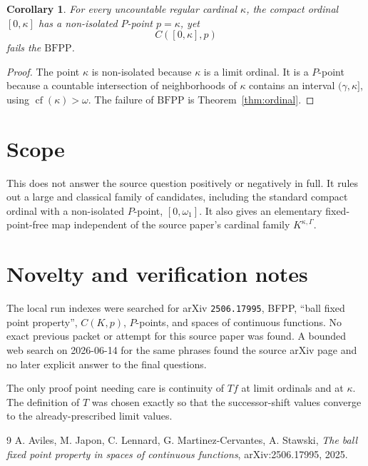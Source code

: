 \documentclass[11pt]{article}
\newtheorem{corollary}{Corollary}
\newcommand{\BFPP}{\mathrm{BFPP}}
\begin{document}
\begin{corollary}\label{cor:Ppoint}
For every uncountable regular cardinal \(\kappa\), the compact ordinal
\([0,\kappa]\) has a non-isolated \(P\)-point \(p=\kappa\), yet
\[
  C([0,\kappa],p)
\]
fails the \(\BFPP\).
\end{corollary}

\begin{proof}
The point \(\kappa\) is non-isolated because \(\kappa\) is a limit ordinal.  It
is a \(P\)-point because a countable intersection of neighborhoods of
\(\kappa\) contains an interval \((\gamma,\kappa]\), using
\(\operatorname{cf}(\kappa)>\omega\).  The failure of \(\BFPP\) is
Theorem~\ref{thm:ordinal}.
\end{proof}

\section*{Scope}

This does not answer the source question positively or negatively in full.  It
rules out a large and classical family of candidates, including the standard
compact ordinal with a non-isolated \(P\)-point, \([0,\omega_1]\).  It also
gives an elementary fixed-point-free map independent of the source paper's
cardinal family \(K^{\kappa,\Gamma}\).

\section*{Novelty and verification notes}

The local run indexes were searched for arXiv \texttt{2506.17995}, BFPP,
``ball fixed point property'', \(C(K,p)\), \(P\)-points, and spaces of
continuous functions.  No exact previous packet or attempt for this source
paper was found.  A bounded web search on 2026-06-14 for the same phrases
found the source arXiv page and no later explicit answer to the final
questions.

The only proof point needing care is continuity of \(Tf\) at limit ordinals
and at \(\kappa\).  The definition of \(T\) was chosen exactly so that the
successor-shift values converge to the already-prescribed limit values.

\begin{thebibliography}{9}
A. Aviles, M. Japon, C. Lennard, G. Martinez-Cervantes, A. Stawski,
\emph{The ball fixed point property in spaces of continuous functions},
arXiv:2506.17995, 2025.
\end{thebibliography}
\end{document}
